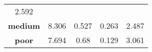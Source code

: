 \documentclass[]{article}
\begin{document}
\begin{longtable}[]{@{}ccccc@{}}
\begin{minipage}[t]{0.18\columnwidth}
2.592\strut
\end{minipage}\tabularnewline
\begin{minipage}[t]{0.14\columnwidth}\centering\strut
\textbf{medium}\strut
\end{minipage} & \begin{minipage}[t]{0.18\columnwidth}\centering\strut
8.306\strut
\end{minipage} & \begin{minipage}[t]{0.21\columnwidth}\centering\strut
0.527\strut
\end{minipage} & \begin{minipage}[t]{0.15\columnwidth}\centering\strut
0.263\strut
\end{minipage} & \begin{minipage}[t]{0.18\columnwidth}\centering\strut
2.487\strut
\end{minipage}\tabularnewline
\begin{minipage}[t]{0.14\columnwidth}\centering\strut
\textbf{poor}\strut
\end{minipage} & \begin{minipage}[t]{0.18\columnwidth}\centering\strut
7.694\strut
\end{minipage} & \begin{minipage}[t]{0.21\columnwidth}\centering\strut
0.68\strut
\end{minipage} & \begin{minipage}[t]{0.15\columnwidth}\centering\strut
0.129\strut
\end{minipage} & \begin{minipage}[t]{0.18\columnwidth}\centering\strut
3.061\strut
\end{minipage}\tabularnewline
\bottomrule
\end{longtable}
\end{document}
